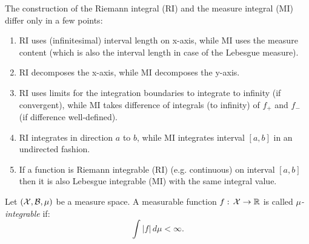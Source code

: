 \begin{Rem}
    The construction of the Riemann integral (RI) and the measure integral (MI) differ only in a few points:
    \begin{enumerate}
        \item RI uses (infinitesimal) interval length on x-axis, while MI uses the measure content
            (which is also the interval length in case of the Lebesgue measure).
        \item RI decomposes the x-axis, while MI decomposes the y-axis.
        \item RI uses limits for the integration boundaries to integrate to infinity (if convergent), 
                while MI takes difference of integrals (to infinity) of $f_+$ and $f_-$ (if difference well-defined).
        \item RI integrates in direction $a$ to $b$, while MI integrates interval $[a,b]$ in an undirected fashion.
        \item If a function is Riemann integrable (RI) (e.g. continuous) on interval $[a,b]$ 
            then it is also Lebesgue integrable (MI) with the same integral value.
    \end{enumerate}
\end{Rem}

\begin{Def}
   Let $(\mathcal{X},\mathcal{B},\mu)$ be a measure space. A measurable function $f:\,\mathcal{X} \to \mathbb{R}$ is called \emph{$\mu$-integrable} if:
    \[  \int |f|\, d\mu < \infty.\]
\end{Def}

